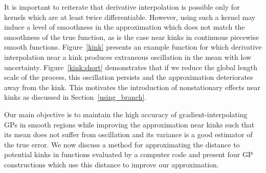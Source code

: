 \documentclass{article}
\numberwithin{equation}{section}
\begin{document}
It is important to reiterate that derivative interpolation is possible only for kernels which are at least twice differentiable. However, using such a kernel may induce a level of smoothness in the approximation which does not match the smoothness of the true function, as is the case near kinks in continuous piecewise smooth functions. Figure~\ref{kink} presents an example function for which derivative interpolation near a kink produces extraneous oscillation in the mean with low uncertainty. Figure~\ref{kink:short} demonstrates that if we reduce the global length scale of the process, this oscillation persists and the approximation deteriorates away from the kink. This motivates the introduction of nonstationary effects near kinks as discussed in Section~\ref{using_branch}.

Our main objective is to maintain the high accuracy of gradient-interpolating GPs in smooth regions while improving the approximation near kinks such that its mean does not suffer from oscillation and its variance is a good estimator of the true error. We now discuss a method for approximating the distance to potential kinks in functions evaluated by a computer code and present four GP constructions which use this distance to improve our approximation.
\end{document}
